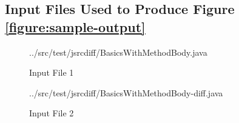 \begin{appendices}

\chapter{Input Files Used to Produce Figure \ref{figure:sample-output}}
\label{appendix:input-files}

\begin{figure}
\caption{Input File 1}

{../src/test/jsrcdiff/BasicsWithMethodBody.java}

\end{figure}

\begin{figure}
\caption{Input File 2}

{../src/test/jsrcdiff/BasicsWithMethodBody-diff.java}

\end{figure}

\end{appendices}


